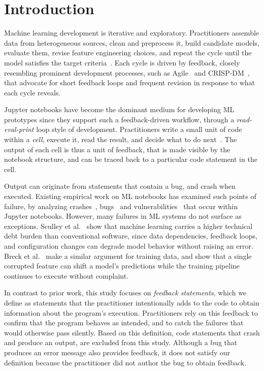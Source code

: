 \documentclass[a4paper,USenglish,cleveref,autoref,thm-restate,anonymous]{lipics-v2021}       %
\begin{document}
\section{Introduction}

Machine learning development is iterative and exploratory.
Practitioners assemble data from heterogeneous sources,
clean and preprocess it,
build candidate models,
evaluate them,
revise feature engineering choices,
and repeat the cycle until the model
satisfies the target criteria~\cite{haakman2021ai,amershi2019software,sculley2015hidden}.
Each cycle is driven by feedback,
closely resembling prominent development processes,
such as Agile~\cite{betz2018managing} and CRISP-DM~\cite{martinez-plumed2021crisp-dm},
that advocate for short feedback loops
and frequent revision in response to what each cycle reveals.

Jupyter notebooks have become the dominant medium for developing ML prototypes
since they support such a feedback-driven workflow,
through a \emph{read-eval-print} loop style of development.
Practitioners write a small unit of code within a \emph{cell},
execute it,
read the result,
and decide what to do next~\cite{pimentel2019large-scale,quaranta2021kgtorrent,psallidas2019data,perkel2018why}.
The output of each cell is thus a unit of feedback,
that is made visible by the notebook structure,
and can be traced back to a particular code statement in the cell.

Output can originate from statements that contain a bug,
and crash when executed.
Existing empirical work on ML notebooks
has examined such points of failure,
by analyzing crashes~\cite{wang2025why}, bugs~\cite{desantana2024bug} and vulnerabilities~\cite{jiang2025exploring}
that occur within Jupyter notebooks.
However, many failures in ML systems do not surface as exceptions.
Sculley et al.~\cite{sculley2015hidden} show
that machine learning carries a higher technical debt burden than conventional software,
since data dependencies, feedback loops, and configuration changes
can degrade model behavior without raising an error.
Breck et al.~\cite{breck2019data} make a similar argument for training data,
and show that a single corrupted feature
can shift a model's predictions
while the training pipeline continues to execute without complaint.

In contrast to prior work,
this study focuses on \emph{feedback statements},
which we define as statements that the practitioner intentionally adds to the code
to obtain information about the program's execution.
Practitioners rely on this feedback
to confirm that the program behaves as intended,
and to catch the failures that would otherwise pass silently.
Based on this definition,
code statements that crash and produce an output,
are excluded from this study.
Although a bug that produces an error message also provides feedback,
it does not satisfy our definition
because the practitioner did not author the bug to obtain feedback.
\end{document}
